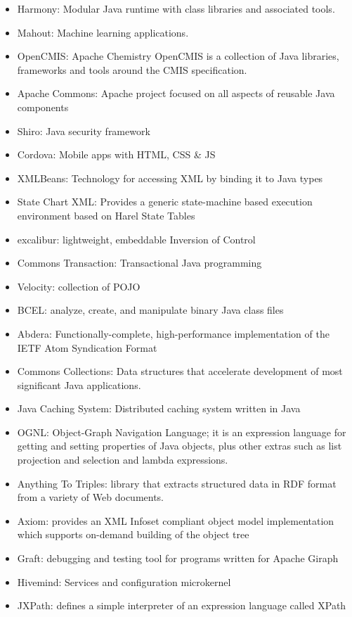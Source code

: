 \documentclass[12pt]{report}
\providecommand{\tightlist}{%
  \setlength{\itemsep}{0pt}\setlength{\parskip}{0pt}}
\begin{document}
\begin{itemize}
\tightlist
\item
  Harmony: Modular Java runtime with class libraries and associated
  tools.
\item
  Mahout: Machine learning applications.
\item
  OpenCMIS: Apache Chemistry OpenCMIS is a collection of Java libraries,
  frameworks and tools around the CMIS specification.
\item
  Apache Commons: Apache project focused on all aspects of reusable Java
  components
\item
  Shiro: Java security framework
\item
  Cordova: Mobile apps with HTML, CSS \& JS
\item
  XMLBeans: Technology for accessing XML by binding it to Java types
\item
  State Chart XML: Provides a generic state-machine based execution
  environment based on Harel State Tables
\item
  excalibur: lightweight, embeddable Inversion of Control
\item
  Commons Transaction: Transactional Java programming
\item
  Velocity: collection of POJO
\item
  BCEL: analyze, create, and manipulate binary Java class files
\item
  Abdera: Functionally-complete, high-performance implementation of the
  IETF Atom Syndication Format
\item
  Commons Collections: Data structures that accelerate development of
  most significant Java applications.
\item
  Java Caching System: Distributed caching system written in Java
\item
  OGNL: Object-Graph Navigation Language; it is an expression language
  for getting and setting properties of Java objects, plus other extras
  such as list projection and selection and lambda expressions.
\item
  Anything To Triples: library that extracts structured data in RDF
  format from a variety of Web documents.
\item
  Axiom: provides an XML Infoset compliant object model implementation
  which supports on-demand building of the object tree
\item
  Graft: debugging and testing tool for programs written for Apache
  Giraph
\item
  Hivemind: Services and configuration microkernel
\item
  JXPath: defines a simple interpreter of an expression language called
  XPath
\end{itemize}
\end{document}
